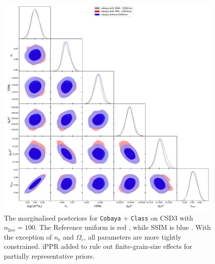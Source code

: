 \documentclass[usenatbib]{mnras}
\begin{document}
\begin{landscape}
\begin{figure}
  \centering %
  \includegraphics[height=0.95\textheight]{./illustrations/cosmology.pdf}
  \caption{The marginalised posteriors for \texttt{Cobaya} +
    \texttt{Class} on CSD3 with \(n_\text{live}=100\). The Reference
    uniform is \color{red} red \color{black}, while SSIM is
    \color{blue} blue \color{black}. With the exception of
    \(n_\mathrm{s}\) and \(\Omega_\mathrm{c}\), all parameters are
    more tightly constrained. iPPR added to rule out finite-grain-size
    effects for partially representative
    priors. } \label{fig:cosmology}
\end{figure}
\end{landscape}
\end{document}
